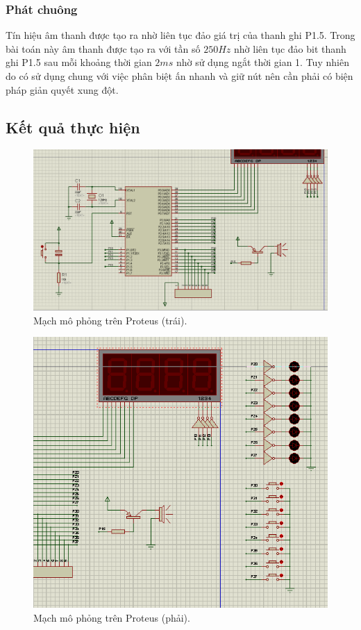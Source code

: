 \documentclass[../report.tex]{subfiles}
\begin{document}
\subsubsection{Phát chuông} 
Tín hiệu âm thanh được tạo ra nhờ liên tục đảo giá trị của thanh ghi P1.5. Trong bài toán này âm thanh được tạo ra với tần số $250Hz$ 
nhờ liên tục đảo bit thanh ghi P1.5 sau mỗi khoảng thời gian $2ms$ nhờ sử dụng ngắt thời gian 1. 
Tuy nhiên do có sử dụng chung với việc phân biệt ấn nhanh và giữ nút nên cần phải có biện pháp giản quyết xung đột. 

\subsection{Kết quả thực hiện}
\begin{figure}[H]
    \centering
    \includegraphics[width=\textwidth]{figures/diagram-left.png}
    \caption{Mạch mô phỏng trên Proteus (trái).}
\end{figure}

\begin{figure}[H]
    \centering
    \includegraphics[width=12cm]{figures/diagram-right.png}
    \caption{Mạch mô phỏng trên Proteus (phải).}
\end{figure}
\end{document}
